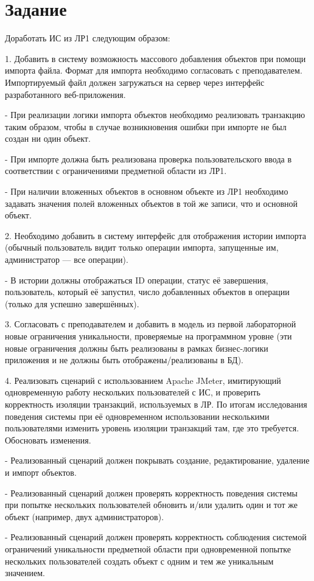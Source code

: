 \section{Задание}
Доработать ИС из ЛР1 следующим образом:


1. Добавить в систему возможность массового добавления объектов при помощи импорта файла. Формат для импорта необходимо согласовать с преподавателем. Импортируемый файл должен загружаться на сервер через интерфейс разработанного веб-приложения.


- При реализации логики импорта объектов необходимо реализовать транзакцию таким образом, чтобы в случае возникновения ошибки при импорте не был создан ни один объект.


- При импорте должна быть реализована проверка пользовательского ввода в соответствии с ограничениями предметной области из ЛР1.


- При наличии вложенных объектов в основном объекте из ЛР1 необходимо задавать значения полей вложенных объектов в той же записи, что и основной объект.


2. Необходимо добавить в систему интерфейс для отображения истории импорта (обычный пользователь видит только операции импорта, запущенные им, администратор — все операции).


- В истории должны отображаться ID операции, статус её завершения, пользователь, который её запустил, число добавленных объектов в операции (только для успешно завершённых).


3. Согласовать с преподавателем и добавить в модель из первой лабораторной новые ограничения уникальности, проверяемые на программном уровне (эти новые ограничения должны быть реализованы в рамках бизнес-логики приложения и не должны быть отображены/реализованы в БД).


4. Реализовать сценарий с использованием Apache JMeter, имитирующий одновременную работу нескольких пользователей с ИС, и проверить корректность изоляции транзакций, используемых в ЛР. По итогам исследования поведения системы при её одновременном использовании несколькими пользователями изменить уровень изоляции транзакций там, где это требуется. Обосновать изменения.


- Реализованный сценарий должен покрывать создание, редактирование, удаление и импорт объектов.


- Реализованный сценарий должен проверять корректность поведения системы при попытке нескольких пользователей обновить и/или удалить один и тот же объект (например, двух администраторов).


- Реализованный сценарий должен проверять корректность соблюдения системой ограничений уникальности предметной области при одновременной попытке нескольких пользователей создать объект с одним и тем же уникальным значением.


